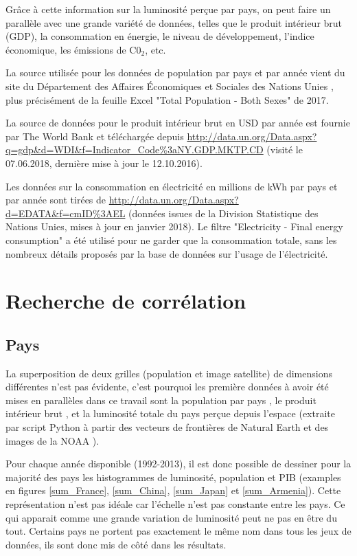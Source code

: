 \documentclass[a4paper, 11pt]{report}
\begin{document}
Grâce à cette information sur la luminosité perçue par pays, on peut faire un parallèle avec une grande variété de données, telles que le produit intérieur brut (GDP), la consommation en énergie, le niveau de développement, l'indice économique, les émissions de C0$_2$, etc.

La source utilisée pour les données de population par pays et par année vient du site du Département des Affaires Économiques et Sociales des Nations Unies \cite{un-wpp}, plus précisément de la feuille Excel "Total Population - Both Sexes" de 2017.

La source de données pour le produit intérieur brut en USD par année est fournie par The World Bank \cite{theworldbank} et téléchargée depuis \url{http://data.un.org/Data.aspx?q=gdp&d=WDI&f=Indicator_Code%3aNY.GDP.MKTP.CD} (visité le 07.06.2018, dernière mise à jour le 12.10.2016).

Les données sur la consommation en électricité en millions de kWh par pays et par année sont tirées de \url{http://data.un.org/Data.aspx?d=EDATA&f=cmID%3AEL} (données issues de la Division Statistique des Nations Unies, mises à jour en janvier 2018). Le filtre "Electricity - Final energy consumption" a été utilisé pour ne garder que la consommation totale, sans les nombreux détails proposés par la base de données sur l'usage de l'électricité.

\section{Recherche de corrélation}
\subsection{Pays}
La superposition de deux grilles (population et image satellite) de dimensions différentes n'est pas évidente, c'est pourquoi les première données à avoir été mises en parallèles dans ce travail sont la population par pays \cite{un-wpp}, le produit intérieur brut \cite{theworldbank}, et la luminosité totale du pays perçue depuis l'espace (extraite par script Python à partir des vecteurs de frontières de Natural Earth \cite{naturalearthdata} et des images de la NOAA \cite{noaa}).

Pour chaque année disponible (1992-2013), il est donc possible de dessiner pour la majorité des pays les histogrammes de luminosité, population et PIB (examples en figures \ref{sum_France}, \ref{sum_China}, \ref{sum_Japan} et \ref{sum_Armenia}). Cette représentation n'est pas idéale car l'échelle n'est pas constante entre les pays. Ce qui apparait comme une grande variation de luminosité peut ne pas en être du tout. Certains pays ne portent pas exactement le même nom dans tous les jeux de données, ils sont donc mis de côté dans les résultats.
\end{document}
